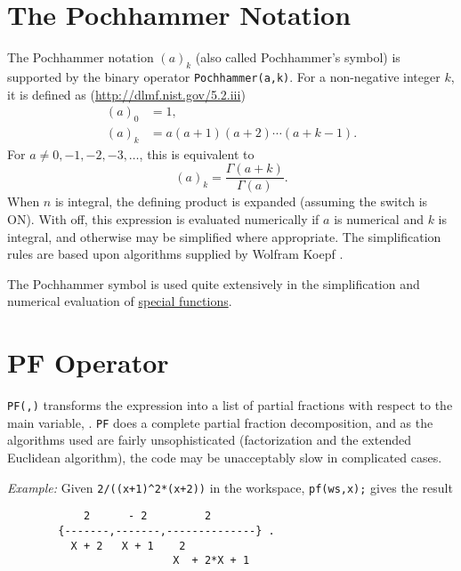 \section{The Pochhammer Notation}
\hypertarget{POCH}{}
\hypertarget{operator:POCHHAMMER}{}
The Pochhammer notation $(a)_k$ (also called Pochhammer's symbol) is supported
by the binary operator \texttt{Pochhammer(a,k)}.
For a non-negative integer $k$, it is defined as
(\url{http://dlmf.nist.gov/5.2.iii})
\begin{align*}
  (a)_0 &= 1, \\
  (a)_k &= a(a+1)(a+2)\cdots(a+k-1).
\end{align*}
For $a \neq 0, -1, -2, -3, \ldots$, this is equivalent to
\[ (a)_k = \frac{\Gamma(a+k)}{\Gamma(a)}. \]
When $n$ is integral, the defining product is expanded (assuming the switch
 is ON). With  off, this expression is evaluated
numerically if $a$ is numerical and $k$ is integral, and otherwise may be
simplified where appropriate.  The simplification rules are based upon
algorithms supplied by Wolfram Koepf \cite{Koepf:92}.

The Pochhammer symbol is used quite extensively in the simplification and
numerical evaluation of \hyperlink{SPECFNS}{special functions}.

\section{PF Operator}
\hypertarget{operator:PF}{}

\texttt{PF(,)} transforms the expression  into
a list of partial fractions with respect to the main variable, .
\texttt{PF}
does a complete partial fraction decomposition, and as the algorithms used
are fairly unsophisticated (factorization and the extended Euclidean
algorithm), the code may be unacceptably slow in complicated cases.

\textit{Example:}
Given \texttt{2/((x+1)\textasciicircum2*(x+2))} in the workspace,
\texttt{pf(ws,x);} gives the result
\begin{samepage}
\begin{verbatim}
            2      - 2         2
        {-------,-------,--------------} .
          X + 2   X + 1    2
                          X  + 2*X + 1
\end{verbatim}
\end{samepage}

